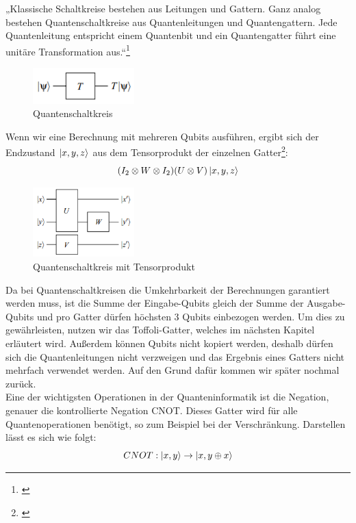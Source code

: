 „Klassische Schaltkreise bestehen aus Leitungen und Gattern.
Ganz analog bestehen Quantenschaltkreise aus Quantenleitungen und Quantengattern.
Jede Quantenleitung entspricht einem Quantenbit und ein Quantengatter führt eine unitäre Transformation aus.“\footnote{\cite[S. 76]{homeister_quantum_2022}}\\
\begin{figure}[H]
    \centering
    \includegraphics[width=0.35\textwidth]{img/Quantengatter Basic}
    \caption{Quantenschaltkreis}
    \label{fig:quantenschaltkreis}
\end{figure}

Wenn wir eine Berechnung mit mehreren Qubits ausführen, ergibt sich der Endzustand $\ket{x, y, z}$ aus dem Tensorprodukt der einzelnen Gatter\footnote{\cite[S. 76]{homeister_quantum_2022}}:
\begin{equation}
    (I_{2} \otimes W \otimes I_{2})(U \otimes V)\ket{x, y, z}
\end{equation}

\begin{figure}[H]
    \centering
    \includegraphics[width=0.35\textwidth]{img/Quantengatter 3er}
    \caption{Quantenschaltkreis mit Tensorprodukt}
    \label{fig:quantenschaltkreis-tensorprodukt}
\end{figure}

Da bei Quantenschaltkreisen die Umkehrbarkeit der Berechnungen garantiert werden muss, ist die Summe der Eingabe-Qubits gleich der Summe der Ausgabe-Qubits und pro Gatter dürfen höchsten 3 Qubits einbezogen werden.
Um dies zu gewährleisten, nutzen wir das Toffoli-Gatter, welches im nächsten Kapitel erläutert wird.
Außerdem können Qubits nicht kopiert werden, deshalb dürfen sich die Quantenleitungen nicht verzweigen und das Ergebnis eines Gatters nicht mehrfach verwendet werden.
Auf den Grund dafür kommen wir später nochmal zurück.\\

Eine der wichtigsten Operationen in der Quanteninformatik ist die Negation, genauer die kontrollierte Negation CNOT\@.
Dieses Gatter wird für alle Quantenoperationen benötigt, so zum Beispiel bei der Verschränkung.
Darstellen lässt es sich wie folgt:
\begin{equation}
    CNOT : \ket{x,y} \rightarrow \ket{x,y\oplus x}
\end{equation}

